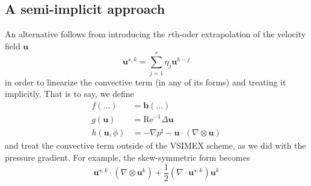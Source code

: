 \documentclass[]{scrartcl}
\newcommand{\bs}[1]{\boldsymbol{#1}}
\begin{document}
\subsection{A semi-implicit approach}
An alternative follows from introducing the $r$th-oder extrapolation of the velocity field $\bs{u}$ 
\begin{equation*}
\bs{u}^{\star, k} = \sum_{j=1}^{r} \eta_j \bs{u}^{k-j}
\end{equation*}
in order to linearize the convective term (in any of its forms) and treating it implicitly. That is to say, we define
\begin{equation*}
\begin{aligned}
f(\dots) &= \bs{b}(\dots) \\
g(\bs{u}) &= \textrm{Re}^{-1} \Delta \bs{u}\\
h(\bs{u}, \phi) &= -\nabla p^\sharp - \bs{u} \cdot (\nabla \otimes \bs{u})
\end{aligned}
\end{equation*}
and treat the convective term outside of the VSIMEX scheme, as we did with the pressure gradient. For example, the skew-symmetric form becomes
\begin{equation*}
	\bs{u}^{\star, k} \cdot (\nabla \otimes \bs{u}^{k}) + \dfrac{1}{2} (\nabla \cdot \bs{u}^{\star, k})\bs{u}^{k}
\end{equation*}
\end{document}
